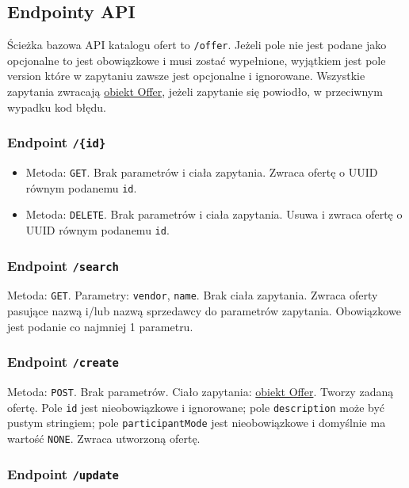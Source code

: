 \documentclass[11pt]{article}
\begin{document}
\subsection{Endpointy API}

Ścieżka bazowa API katalogu ofert to \texttt{/offer}. Jeżeli pole nie jest podane jako opcjonalne to jest obowiązkowe i musi zostać wypełnione, wyjątkiem jest pole version które w zapytaniu zawsze jest opcjonalne i ignorowane. Wszystkie zapytania zwracają \hyperref[schema:offer]{obiekt Offer}, jeżeli zapytanie się powiodło, w przeciwnym wypadku kod błędu.


\subsubsection{Endpoint \texttt{/\{id\}}}

\begin{itemize}
  \item Metoda: \texttt{GET}. Brak parametrów i ciała zapytania. Zwraca ofertę o UUID równym podanemu \texttt{id}.
  \item Metoda: \texttt{DELETE}. Brak parametrów i ciała zapytania. Usuwa i zwraca ofertę o UUID równym podanemu \texttt{id}.
\end{itemize}

\subsubsection{Endpoint \texttt{/search}}

Metoda: \texttt{GET}. Parametry: \texttt{vendor}, \texttt{name}. Brak ciała zapytania. Zwraca oferty pasujące nazwą i/lub nazwą sprzedawcy do parametrów zapytania. Obowiązkowe jest podanie co najmniej 1 parametru.

\subsubsection{Endpoint \texttt{/create}}

Metoda: \texttt{POST}. Brak parametrów. Ciało zapytania: \hyperref[schema:offer]{obiekt Offer}. Tworzy zadaną ofertę. Pole \texttt{id} jest nieobowiązkowe i ignorowane; pole \texttt{description} może być pustym stringiem; pole \texttt{participantMode} jest nieobowiązkowe i domyślnie ma wartość \texttt{NONE}. Zwraca utworzoną ofertę.

\subsubsection{Endpoint \texttt{/update}}
\end{document}
